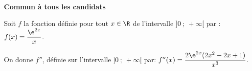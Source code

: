 
\textbf{Commun à tous les candidats}

\medskip


%

Soit $f$ la fonction définie pour tout $x\in\R$ de l'intervalle $]0~;~ +\infty[$ par :
$ f(x) =\dfrac{\e^{2x}}{x}$.

On donne $f''$, définie sur l'intervalle $]0~;~ +\infty[$ par:
$f''(x)=\dfrac {2 \e^{2x} (2x^2-2x+1)}{x^3}$.

\smallskip

